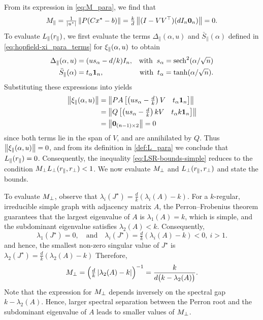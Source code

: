 \documentclass[letterpaper, 10 pt, conference]{ieeeconf}
\begin{document}
From its expression in \eqref{eq:M_para}, we find that
\begin{equation*}
    M_{\parallel} = \tfrac{1}{\left\lvert{u^{\star}}\right\rvert}\left\lVert{P(Cx^{\star} - b)}\right\rVert = \tfrac{k}{d}\left\lVert{(I - VV^{\top})(dI_{n}\mathbf{0}_{n})}\right\rVert = 0.
\end{equation*}
To evaluate \(L_{\parallel}(r_{\parallel})\), we first evaluate the terms \(\Delta_{\parallel}(\alpha,u)\) and \(\bar{S}_{\parallel}(\alpha)\) defined in \eqref{eq:hopfield-xi_para_terms} for \(\xi_{\parallel}(\alpha,u)\) to obtain
\begin{align*}
    \Delta_{\parallel}(\alpha,u) & = (us_{\alpha} - d/k)I_n,   & \text{with}\;\; s_{\alpha} = \operatorname{sech}^2(\alpha/\sqrt{n}) \\
    \bar{S}_{\parallel}(\alpha)  & = t_{\alpha}\mathbf{1}_{n}, & \text{with}\;\; t_{\alpha} = \tanh(\alpha/\sqrt{n}).
\end{align*}
Substituting these expressions into  yields
\begin{align*}
    \left\lVert{\ensuremath{\xi_{\parallel}(\alpha,u)}}\right\rVert & = \left\lVert{P A \begin{bmatrix}\left(us_{\alpha} - \tfrac{d}{k}\right) V & t_{\alpha} \mathbf{1}_{n} \end{bmatrix}}\right\rVert  \\
                    & = \left\lVert{Q \begin{bmatrix}\left(us_{\alpha} - \tfrac{d}{k}\right) k V & t_{\alpha} k \mathbf{1}_{n}\end{bmatrix}}\right\rVert \\
                    & = \left\lVert{\mathbf{0}_{(n-1)\times2}}\right\rVert = 0
\end{align*}
since both terms lie in the span of \(V\), and are annihilated by \(Q\).
Thus \(\left\lVert{\ensuremath{\xi_{\parallel}(\alpha,u)}}\right\rVert = 0\), and from its definition in \eqref{def:L_para} we conclude that \(L_{\parallel}(r_{\parallel}) = 0\).
Consequently, the inequality \eqref{eq:LSR-bounds-simple} reduces to the condition \(M_{\perp}L_{\perp}(r_{\parallel},r_{\perp}) < 1\). We now evaluate \(M_{\perp}\) and \(L_{\perp}(r_{\parallel},r_{\perp})\) and state the bounds.

To evaluate \(M_{\perp}\), %
observe that \(\lambda_i(J^{\star}) = \tfrac{d}{k}(\lambda_i(A) - k)\). For a \(k\)-regular, irreducible simple graph with adjacency matrix \(A\), the Perron--Frobenius theorem guarantees that the largest eigenvalue of \(A\) is \(\lambda_1(A) = k\), which is simple, and the subdominant eigenvalue satisfies \(\lambda_2(A) < k\). Consequently,
\begin{equation*}
    \lambda_{1}(J^{\star}) = 0, \quad\text{and}\quad \lambda_{i}(J^{\star}) = \tfrac{d}{k}(\lambda_i(A) - k) < 0, \ i > 1.
\end{equation*}
and hence, the smallest non-zero singular value of \(J^{\star}\) is \(\lambda_{2}(J^{\star}) = \tfrac{d}{k}(\lambda_{2}(A) - k)\) Therefore,
\begin{equation*}
    M_{\perp} = \Bigl(\tfrac{d}{k}\left\lvert{\lambda_{2}(A) - k}\right\rvert\Bigr)^{-1} = \frac{k}{d\big(k - \lambda_{2}(A)\big)}.
\end{equation*}
Note that the expression for \(M_{\perp}\) depends inversely on the spectral gap \(k - \lambda_2(A)\). Hence, larger spectral separation between the Perron root and the subdominant eigenvalue of \(A\) leads to smaller values of \(M_{\perp}\).
\end{document}
